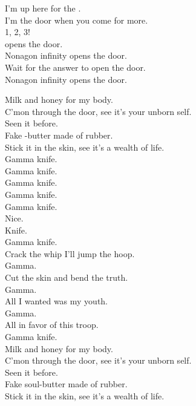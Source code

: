 I'm up here for the . \\
I'm the door when you come for more. \\

1, 2, 3! \\

 opens the door. \\
Nonagon infinity opens the door. \\
Wait for the answer to open the door. \\
Nonagon infinity opens the door. \\




Milk and honey for my body. \\
C'mon through the door, see it's your unborn self. \\
Seen it before. \\
Fake -butter made of rubber. \\
Stick it in the skin, see it's a wealth of life. \\

Gamma knife. \\
Gamma knife. \\
Gamma knife. \\
Gamma knife. \\

Gamma knife. \\
Nice. \\
Knife. \\
Gamma knife. \\

Crack the whip I'll jump the hoop. \\
Gamma. \\
Cut the skin and bend the truth. \\
Gamma. \\
All I wanted was my youth. \\
Gamma. \\
All in favor of this troop. \\
Gamma knife. \\

Milk and honey for my body. \\
C'mon through the door, see it's your unborn self. \\
Seen it before. \\
Fake soul-butter made of rubber. \\
Stick it in the skin, see it's a wealth of life. \\

